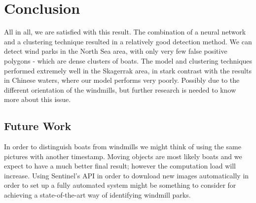 \section{Conclusion}
%


All in all, we are satisfied with this result. The combination of a neural network and a clustering technique resulted in a relatively good detection method. We can detect wind parks in the North Sea area, with only very few false positive polygons - which are dense clusters of boats. The model and clustering techniques performed extremely well in the Skagerrak area, in stark contrast with the results in Chinese waters, where our model performs very poorly. Possibly due to the different orientation of the windmills, but further research is needed to know more about this issue.


\subsection{Future Work}
In order to distinguish boats from windmills we might think of using the same pictures with another timestamp. Moving objects are most likely boats and we expect to have a much better final result; however the computation load will increase. Using Sentinel's API in order to download new images automatically in order to set up a fully automated system might be something to consider for achieving a state-of-the-art way of identifying windmill parks.
